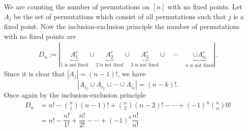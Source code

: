 \begin{solution}
We are counting the number of permutations on $[n]$ with no fixed points. Let $A_j$ be the set of permutations which consist of all permutations such that $j$ is a fixed point. Now the inclusion-exclusion principle the number of permutations with no fixed points are
\begin{align*}
D_n:=|\underbrace{A_1^c}_{1 \text{ is not fixed}} \cup \underbrace{A_2^c}_{2 \text{ is not fixed}} \cup \underbrace{A_3^c}_{3 \text{ is not fixed}} \cup \quad \cdots \quad \underbrace{\cup A_n^c}_{n \text{ is not fixed}}|.
\end{align*}
Since it is clear that $|A_j|=(n-1)!$, we have
\[
|A_{i_1}\cup A_{i_2}\cup \cdots \cup A_{i_k}| = (n-k)!.
\]
Once again by the inclusion-exclusion principle
\begin{align*}
    D_n &= n! - \binom{n}{1}(n-1)! + \binom{n}{2}(n-2)! -  \cdots + (-1)^n\binom{n}{n}0! \\
    &= n! - \dfrac{n!}{1!} + \dfrac{n!}{2!} - \cdots + (-1)^n\dfrac{n!}{n!}
\end{align*}
\end{solution}

